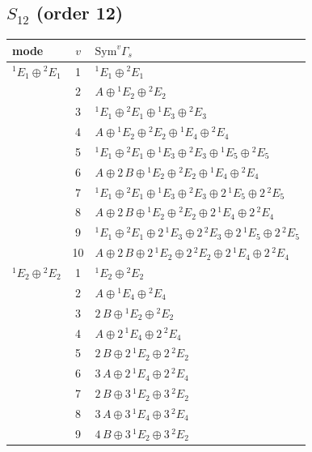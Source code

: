 \documentclass[11pt]{article}
\begin{document}
\subsection*{$S_{12}$ \quad (order 12)}
\begin{longtable}{l c p{}}
\hline mode & $v$ & $\mathrm{Sym}^v\Gamma_s$\\ \hline\endhead
${}^{1}E_{1}\oplus {}^{2}E_{1}$ & 1 & ${}^{1}E_{1}\oplus {}^{2}E_{1}$\\
 & 2 & $A\oplus {}^{1}E_{2}\oplus {}^{2}E_{2}$\\
 & 3 & ${}^{1}E_{1}\oplus {}^{2}E_{1}\oplus {}^{1}E_{3}\oplus {}^{2}E_{3}$\\
 & 4 & $A\oplus {}^{1}E_{2}\oplus {}^{2}E_{2}\oplus {}^{1}E_{4}\oplus {}^{2}E_{4}$\\
 & 5 & ${}^{1}E_{1}\oplus {}^{2}E_{1}\oplus {}^{1}E_{3}\oplus {}^{2}E_{3}\oplus {}^{1}E_{5}\oplus {}^{2}E_{5}$\\
 & 6 & $A\oplus 2\,B\oplus {}^{1}E_{2}\oplus {}^{2}E_{2}\oplus {}^{1}E_{4}\oplus {}^{2}E_{4}$\\
 & 7 & ${}^{1}E_{1}\oplus {}^{2}E_{1}\oplus {}^{1}E_{3}\oplus {}^{2}E_{3}\oplus 2\,{}^{1}E_{5}\oplus 2\,{}^{2}E_{5}$\\
 & 8 & $A\oplus 2\,B\oplus {}^{1}E_{2}\oplus {}^{2}E_{2}\oplus 2\,{}^{1}E_{4}\oplus 2\,{}^{2}E_{4}$\\
 & 9 & ${}^{1}E_{1}\oplus {}^{2}E_{1}\oplus 2\,{}^{1}E_{3}\oplus 2\,{}^{2}E_{3}\oplus 2\,{}^{1}E_{5}\oplus 2\,{}^{2}E_{5}$\\
 & 10 & $A\oplus 2\,B\oplus 2\,{}^{1}E_{2}\oplus 2\,{}^{2}E_{2}\oplus 2\,{}^{1}E_{4}\oplus 2\,{}^{2}E_{4}$\\
\hline
${}^{1}E_{2}\oplus {}^{2}E_{2}$ & 1 & ${}^{1}E_{2}\oplus {}^{2}E_{2}$\\
 & 2 & $A\oplus {}^{1}E_{4}\oplus {}^{2}E_{4}$\\
 & 3 & $2\,B\oplus {}^{1}E_{2}\oplus {}^{2}E_{2}$\\
 & 4 & $A\oplus 2\,{}^{1}E_{4}\oplus 2\,{}^{2}E_{4}$\\
 & 5 & $2\,B\oplus 2\,{}^{1}E_{2}\oplus 2\,{}^{2}E_{2}$\\
 & 6 & $3\,A\oplus 2\,{}^{1}E_{4}\oplus 2\,{}^{2}E_{4}$\\
 & 7 & $2\,B\oplus 3\,{}^{1}E_{2}\oplus 3\,{}^{2}E_{2}$\\
 & 8 & $3\,A\oplus 3\,{}^{1}E_{4}\oplus 3\,{}^{2}E_{4}$\\
 & 9 & $4\,B\oplus 3\,{}^{1}E_{2}\oplus 3\,{}^{2}E_{2}$\\

\end{longtable}
\end{document}
